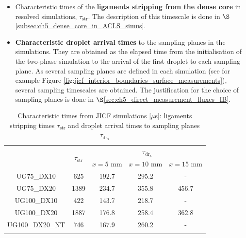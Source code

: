 \begin{itemize}

	\item  Characteristic times of the \textbf{ligaments stripping from the dense core} in resolved simulations, $\tau_\mathrm{str}$. The description of this timescale is done in $\S$\ref{subsec:ch5_dense_core_in_ACLS_simus}.
	
	\item \textbf{Characteristic droplet arrival times} to the sampling planes in the simulations. They are obtained as the elapsed time from the initialisation of the two-phase simulation to the arrival of the first droplet to each sampling plane. As several sampling planes are defined in each simulation (see for example Figure \ref{fig:jicf_interior_boundaries_surface_measurements}), several sampling timescales are obtained.  The justification for the choice of sampling planes is done in $\S$\ref{sec:ch5_direct_measurement_fluxes_IB}.


\end{itemize}

\clearpage



\begin{table}[!h]
\centering
\caption{Characteristic times from JICF simulations [$\mu$s]: ligaments stripping times $\tau_\mathrm{str}$ and droplet arrival times to sampling planes $\tau_\mathrm{dr_x}$ }
\begin{tabular}{ccccc}
\thickhline
\multirow{2}{*}{ \textbf{Case}} & \multirow{2}{*}{ $\tau_\mathrm{str}$} &  \multicolumn{3}{c}{$\tau_\mathrm{dr_x}$} \\
\cline{3-5}
 & & $x = 5$ mm & $x = 10$ mm & $x = 15$ mm  \\
\thickhline 
UG75\_DX10  & 625 & 192.7 & 295.2 & -  \\
UG75\_DX20  & 1389 & 234.7 & 355.8 & 456.7 \\
UG100\_DX10 & 422 & 143.7 & 218.7 & - \\
UG100\_DX20 & 1887 & 176.8 & 258.4 & 362.8 \\
UG100\_DX20\_NT & 746 & 167.9 & 260.2 & - \\
\thickhline
\end{tabular}
\label{tab:jicf_characteristic_droplet_sampling_times}
\end{table}


